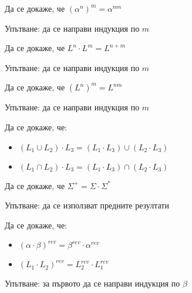 \begin{problem}
Да се докаже, че $(\alpha^n)^m = \alpha^{nm}$

Упътване: да се направи индукция по $m$
\end{problem}

\begin{problem}
Да се докаже, че $L^n \cdot L^m = L^{n + m}$

Упътване: да се направи индукция по $m$
\end{problem}


\begin{problem}
Да се докаже, че $(L^n)^m = L^{nm}$

Упътване: да се направи индукция по $m$
\end{problem}

\begin{problem}[дистрибутивност]
Да се докаже, че:
\begin{itemize}
    \item $(L_1 \cup L_2) \cdot L_3 = (L_1 \cdot L_3) \cup (L_2 \cdot L_3)$
    \item $(L_1 \cap L_2) \cdot L_3 = (L_1 \cdot L_3) \cap (L_2 \cdot L_3)$
\end{itemize}
\end{problem}

\begin{problem}
Да се докаже, че $\Sigma^+ = \Sigma \cdot \Sigma^*$

Упътване: да се използват предните резултати
\end{problem}

\begin{problem}
Да се докаже, че:
\begin{itemize}
    \item $(\alpha \cdot \beta)^{rev} = \beta^{rev} \cdot \alpha^{rev}$
    \item $(L_1 \cdot L_2)^{rev} = L_2^{rev} \cdot L_1^{rev}$
\end{itemize}

Упътване: за първото да се направи индукция по $\beta$
\end{problem}

